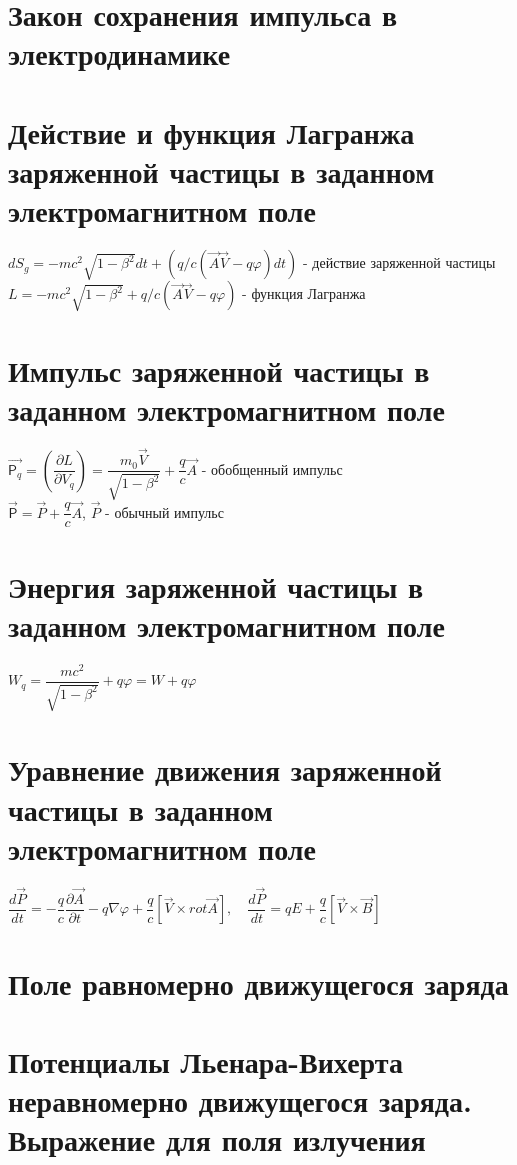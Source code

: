 \begin{multicols*}{2}
		\section{Закон сохранения импульса в электродинамике}
		
		\section{Действие и функция Лагранжа заряженной частицы в заданном электромагнитном поле}
		$dS_g = -mc^2\sqrt{1-\beta^2} dt + (q/c(\vec{A}\vec{V} - q\varphi)dt)$ - действие заряженной частицы\\
		$L = -mc^2\sqrt{1-\beta^2} + q/c(\vec{A}\vec{V} - q\varphi)$ - функция Лагранжа
		
		\section{Импульс заряженной частицы в заданном электромагнитном поле}
		$\vec{\mathsf{P}_q} = (\dfrac{\partial L}{\partial V_q}) = \dfrac{m_0\vec{V}}{\sqrt{1-\beta^2}} + \dfrac{q}{c}\vec{A}$ - обобщенный импульс\\
		$\vec{\mathsf{P}} = \vec{P} + \dfrac{q}{c}\vec{A}$, \quad $\vec{P}$ - обычный импульс
		
		\section{Энергия заряженной частицы в заданном электромагнитном поле}
		$W_q = \dfrac{mc^2}{\sqrt{1-\beta^2}} + q\varphi = W + q\varphi$
		
		\section{Уравнение движения заряженной частицы в заданном электромагнитном поле}
		$\dfrac{d\vec{P}}{dt} = -\dfrac{q}{c}\dfrac{\partial \vec{A}}{\partial t} - q\nabla \varphi + \dfrac{q}{c}\left[\vec{V}\times rot\vec{A}\right], \quad \dfrac{d\vec{P}}{dt} = qE + \dfrac{q}{c}\left[\vec{V}\times \vec{B}\right] $
		
		\section{Поле равномерно движущегося заряда}
		
		\section{Потенциалы Льенара-Вихерта неравномерно движущегося заряда. Выражение для поля излучения}
		

\end{multicols*}
